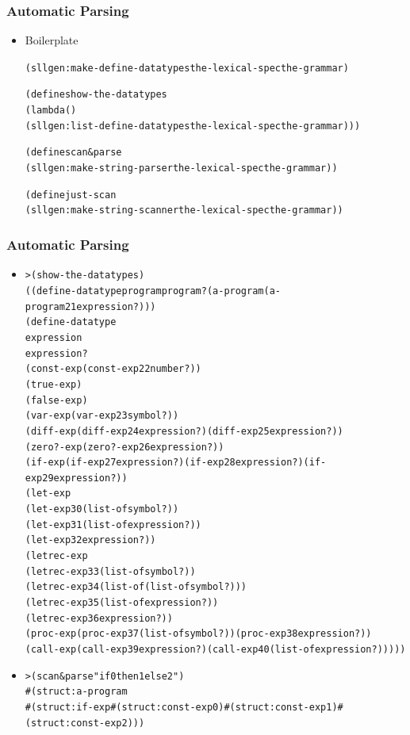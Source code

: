 \documentclass{beamer}
\begin{document}
\begin{frame}[fragile]
\frametitle{Automatic Parsing}
\begin{scriptsize}
\begin{itemize}
\item<1-> Boilerplate
\begin{alltt}
(sllgen:make-define-datatypes the-lexical-spec the-grammar)

(define show-the-datatypes
  (lambda ()
    (sllgen:list-define-datatypes the-lexical-spec the-grammar)))

(define scan&parse
  (sllgen:make-string-parser the-lexical-spec the-grammar))

(define just-scan
  (sllgen:make-string-scanner the-lexical-spec the-grammar))
\end{alltt}

\end{itemize}
\end{scriptsize}
\end{frame}

\begin{frame}[fragile]
\frametitle{Automatic Parsing}
\begin{tiny}
\begin{itemize}
\item<1->
\begin{alltt}
> (show-the-datatypes)
((define-datatype program program? (a-program (a-program21 expression?)))
 (define-datatype
  expression
  expression?
  (const-exp (const-exp22 number?))
  (true-exp)
  (false-exp)
  (var-exp (var-exp23 symbol?))
  (diff-exp (diff-exp24 expression?) (diff-exp25 expression?))
  (zero?-exp (zero?-exp26 expression?))
  (if-exp (if-exp27 expression?) (if-exp28 expression?) (if-exp29 expression?))
  (let-exp
   (let-exp30 (list-of symbol?))
   (let-exp31 (list-of expression?))
   (let-exp32 expression?))
  (letrec-exp
   (letrec-exp33 (list-of symbol?))
   (letrec-exp34 (list-of (list-of symbol?)))
   (letrec-exp35 (list-of expression?))
   (letrec-exp36 expression?))
  (proc-exp (proc-exp37 (list-of symbol?)) (proc-exp38 expression?))
  (call-exp (call-exp39 expression?) (call-exp40 (list-of expression?)))))
\end{alltt}

\item<2->
\begin{alltt}
> (scan&parse "if 0 then 1 else 2")
#(struct:a-program
  #(struct:if-exp #(struct:const-exp 0) #(struct:const-exp 1) #(struct:const-exp 2)))
\end{alltt}

\end{itemize}
\end{tiny}
\end{frame}
\end{document}
